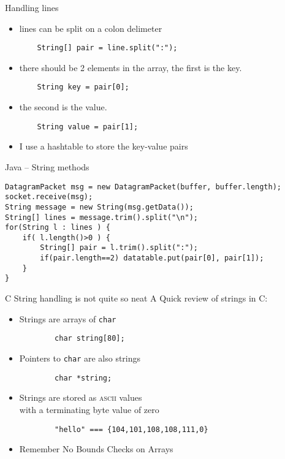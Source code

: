 \documentclass[xcolor=svgnames]{beamer}
\begin{document}
\begin{frame}[fragile]{Handling lines}
\begin{itemize}
\item lines can be split on a colon delimeter
\begin{verbatim}
    String[] pair = line.split(":");
\end{verbatim}

\item there should be 2 elements in the array, the first is the key.
\begin{verbatim}
    String key = pair[0];
\end{verbatim}

\item  the second is the value.
\begin{verbatim}
    String value = pair[1];
\end{verbatim}

\item I use a hashtable to store the key-value pairs
\end{itemize}
\end{frame}

\begin{frame}[fragile]{Java -- String methods}
\begin{verbatim}
DatagramPacket msg = new DatagramPacket(buffer, buffer.length);
socket.receive(msg);
String message = new String(msg.getData());
String[] lines = message.trim().split("\n");
for(String l : lines ) {
    if( l.length()>0 ) {
        String[] pair = l.trim().split(":");
        if(pair.length==2) datatable.put(pair[0], pair[1]);
    }
}
\end{verbatim}
\end{frame}


\begin{frame}[fragile]{C String handling is not quite so neat}
A Quick review of strings in C:
\begin{itemize}
    \item Strings are arrays of \texttt{char}
    \begin{verbatim}
        char string[80];
    \end{verbatim}
    \item Pointers to \texttt{char} are also strings
    \begin{verbatim}
        char *string;
    \end{verbatim}
    \item Strings are stored as \textsc{ascii} values\\ with a terminating byte value of zero
    \begin{verbatim}
        "hello" === {104,101,108,108,111,0}
    \end{verbatim}
    \item Remember \alert{No Bounds Checks on Arrays}
\end{itemize}

\end{frame}
\end{document}
